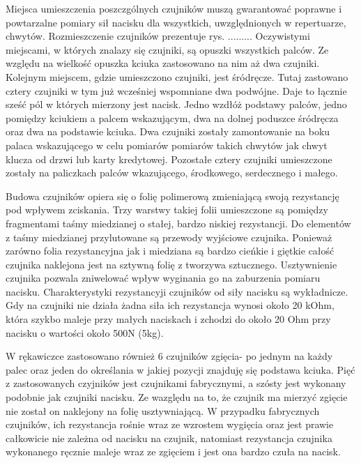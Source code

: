 \documentclass[10pt, a4paper]{article}
\begin{document}
Miejsca umieszczenia poszczgólnych czujników muszą gwarantować poprawne i powtarzalne pomiary sił nacisku dla wszystkich, uwzględnionych w repertuarze, chwytów. Rozmieszczenie czujników prezentuje rys. .........
Oczywistymi miejscami, w których znalazy się czujniki, są opuszki wszystkich palców. Ze względu na wielkość opuszka kciuka zastosowano na nim aż dwa czujniki. Kolejnym miejscem, gdzie umieszczono czujniki, jest śródręcze. Tutaj zastowano cztery czujniki w tym już wcześniej wspomniane dwa podwójne. Daje to łącznie sześć pól w których mierzony jest nacisk. Jedno wzdłóż podstawy palców, jedno pomiędzy kciukiem a palcem wskazującym, dwa na dolnej poduszce śródręcza oraz dwa na podstawie kciuka. Dwa czujniki zostały zamontowanie na boku palaca wskazującego w celu pomiarów pomiarów takich chwytów jak chwyt klucza od drzwi lub karty kredytowej. Pozostałe cztery czujniki umieszczone zostały na paliczkach palców wkazującego, środkowego, serdecznego i małego.

Budowa czujników opiera się o folię polimerową zmieniającą swoją rezystancję pod wpływem zciskania. Trzy warstwy takiej folii umieszczone są pomiędzy fragmentami taśmy miedzianej o stałej, bardzo niskiej rezystancji. Do elementów z taśmy miedzianej przylutowane są przewody wyjściowe czujnika. Ponieważ zarówno folia rezystancyjna jak i miedziana są bardzo cieńkie i giętkie całość czujnika naklejona jest na sztywną folię z tworzywa sztucznego. Usztywnienie czujnika pozwala zniwelować wpływ wyginania go na zaburzenia pomiaru nacisku. Charakterystyki rezystancyji czujników od siły nacisku są wykładnicze. Gdy na czujniki nie działa żadna siła ich rezystancja wynosi około 20 kOhm, która szykbo maleje przy małych naciskach i zchodzi do około 20 Ohm przy nacisku o wartości około 500N (5kg).

W rękawiczce zastosowano również 6 czujników zgięcia- po jednym na każdy palec oraz jeden do określania w jakiej pozycji znajduję się podstawa kciuka. Pięć z zastosowanych czyjników jest czujnikami fabrycznymi, a szósty jest wykonany podobnie jak czujniki nacisku. Ze wazględu na to, że czujnik ma mierzyć zgięcie nie został on naklejony na folię usztywniającą. W przypadku fabrycznych czujników, ich rezystancja rośnie wraz ze wzrostem wygięcia oraz jest prawie całkowicie nie zależna od nacisku na czujnik, natomiast rezystancja czujnika wykonanego ręcznie maleje wraz ze zgięciem i jest ona bardzo czuła na nacisk. 
\end{document}
